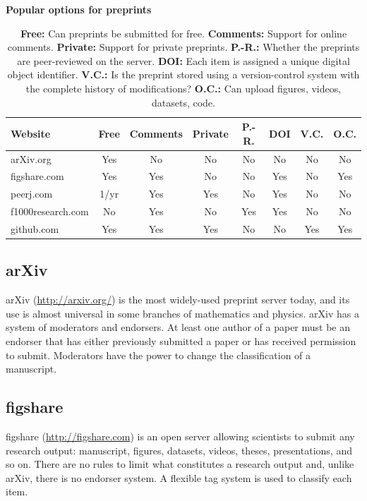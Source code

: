 \documentclass[letterpaper]{article}
\begin{document}
\begin{table}[!ht]
  \caption{\bf{Popular options for preprints}}
  \begin{tabular}{|l|ccccccc|}
  \hline
  Website               & Free & Comments & Private & P.-R. & DOI & V.C. & O.C.\\
  \hline
  arXiv.org             & Yes & No & No & No & No & No & No\\
  figshare.com          & Yes & Yes & No & No & Yes & No & Yes\\
  peerj.com             & 1/yr & Yes & Yes & No & Yes & No & No\\
  f1000research.com     & No & Yes & No & Yes & Yes & No & No\\
  github.com            & Yes & Yes & Yes & No & No & Yes & Yes\\
  \hline
  \end{tabular}
  \caption{
    \textbf{Free:} Can preprints be submitted for free.
    \textbf{Comments:} Support for online comments.
    \textbf{Private:} Support for private preprints.
    \textbf{P.-R.:} Whether the preprints are peer-reviewed on the server.
    \textbf{DOI:} Each item is assigned a unique digital object identifier.
    \textbf{V.C.:} Is the preprint stored using a version-control system with the complete history of modifications?
    \textbf{O.C.:} Can upload figures, videos, datasets, code.
  }
  \label{table:options}
\end{table}

\subsection{arXiv}

arXiv (\url{http://arxiv.org/}) is the most widely-used preprint server today,
and its use is almost universal in some branches of mathematics and physics.
arXiv has a system of moderators and endorsers. At least one author of a paper
must be an endorser that has either previously submitted a paper or has received
permission to submit.  Moderators have the power to change the classification of
a manuscript.

\subsection{figshare}

figshare (\href{http://figshare.com}{http://figshare.com}) is an open server
allowing scientists to submit any research output: manuscript, figures,
datasets, videos, theses, presentations, and so on. There are no rules to limit
what constitutes a research output and, unlike arXiv, there is no endorser
system. A flexible tag system is used to classify each item.
\end{document}
